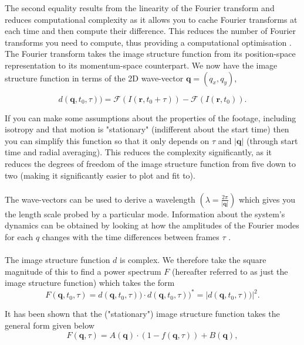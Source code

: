\documentclass[10pt]{article}
\begin{document}
The second equality results from the linearity of the Fourier transform and reduces computational complexity as it allows you to cache Fourier transforms at each time and then compute their difference.
This reduces the number of Fourier transforms you need to compute, thus providing a computational optimisation \cite{ddm2}.
The Fourier transform takes the image structure function from its position-space representation to its momentum-space counterpart. We now have the image structure function in terms of the 2D wave-vector $\textbf{q} =  (q_x, q_y)$,

\begin{equation}
    d(\textbf{q}, t_0, \tau) ) = \mathscr{F}(I(\mathbf{r}, t_0 + \tau)) - \mathscr{F}(I(\mathbf{r}, t_0)).
\end{equation}

If you can make some assumptions about the properties of the footage, including isotropy and that motion is "stationary" (indifferent about the start time) \cite{ddm1} then you can simplify this function so that it only depends on $\tau$ and $|\textbf{q}|$ (through start time and radial averaging). This reduces the complexity significantly, as it reduces the degrees of freedom of the image structure function from five down to two (making it significantly easier to plot and fit to).
\\\\
The wave-vectors can be used to derive a wavelength $(\lambda = \frac{2\pi}{|\textbf{q}|})$ which gives you the length scale probed by a particular mode.
Information about the system's dynamics can be obtained by looking at how the amplitudes of the Fourier modes for each $q$ changes with the time differences between frames $\tau$ \cite{ddm2}.
\\\\
The image structure function $d$ is complex. We therefore take the square magnitude of this to find a power spectrum $F$ (hereafter referred to as just the image structure function) which takes the form
\begin{equation}
F(\textbf{q}, t_0, \tau) = d(\textbf{q}, t_0, \tau)) \cdot d(\textbf{q}, t_0, \tau) )^{*} = |d(\textbf{q}, t_0, \tau) )|^2.
\end{equation}

It has been shown that the ("stationary") image structure function takes the general form given below \cite{ddm1}
\begin{equation}
\label{eqn:power_spectrum}
	F(\textbf{q}, \tau) = A(\textbf{q}) \cdot (1 - f(\textbf{q}, \tau)) + B(\textbf{q}),
\end{equation}
\end{document}
